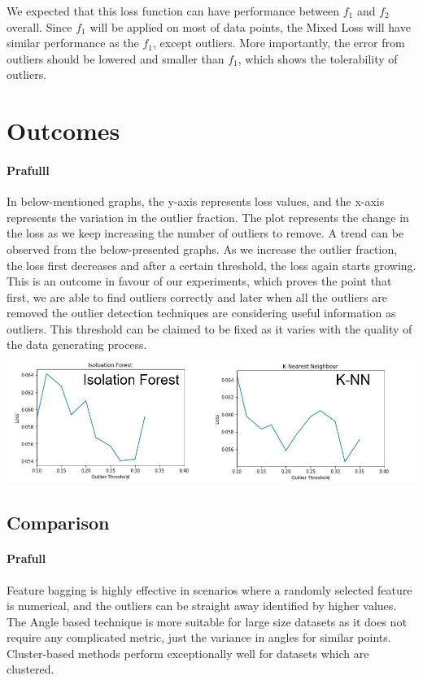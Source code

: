 \documentclass[runningheads]{llncs}
\begin{document}
We expected that this loss function can have performance between $f_1$ and $f_2$ overall. Since $f_1$ will be applied on most of data points, the Mixed Loss will have similar performance as the $f_1$, except outliers. More importantly, the error from outliers should be lowered and smaller than $f_1$, which shows the tolerability of outliers.


\section{Outcomes}
\paragraph{Prafulll} In below-mentioned graphs, the y-axis represents loss values, and the x-axis represents the variation in the outlier fraction. The plot represents the change in the loss as we keep increasing the number of outliers to remove. A trend can be observed from the below-presented graphs.  As we increase the outlier fraction, the loss first decreases and after a certain threshold, the loss again starts growing. This is an outcome in favour of our experiments, which proves the point that first, we are able to find outliers correctly and later when all the outliers are removed the outlier detection techniques are considering useful information as outliers. This threshold can be claimed to be fixed as it varies with the quality of the data generating process. \\
\includegraphics[scale=0.37]{tt2.jpg}


\subsection{Comparison}
\paragraph{Prafull} Feature bagging is highly effective in scenarios where a randomly selected feature is numerical, and the outliers can be straight away identified by higher values. The Angle based technique is more suitable for large size datasets as it does not require any complicated metric, just the variance in angles for similar points. Cluster-based methods perform exceptionally well for datasets which are clustered.
\end{document}
